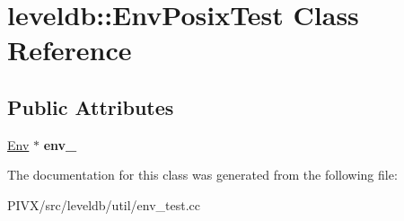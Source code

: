 \hypertarget{classleveldb_1_1_env_posix_test}{}\section{leveldb\+:\+:Env\+Posix\+Test Class Reference}
\label{classleveldb_1_1_env_posix_test}
\subsection*{Public Attributes}
\begin{DoxyCompactItemize}
\item 
\mbox{\label{classleveldb_1_1_env_posix_test_a6d8ded8756fa7391e086fb31a865e639}} 
\mbox{\hyperlink{classleveldb_1_1_env}{Env}} $\ast$ {\bfseries env\+\_\+}
\end{DoxyCompactItemize}


The documentation for this class was generated from the following file\+:\begin{DoxyCompactItemize}
\item 
P\+I\+V\+X/src/leveldb/util/env\+\_\+test.\+cc\end{DoxyCompactItemize}
